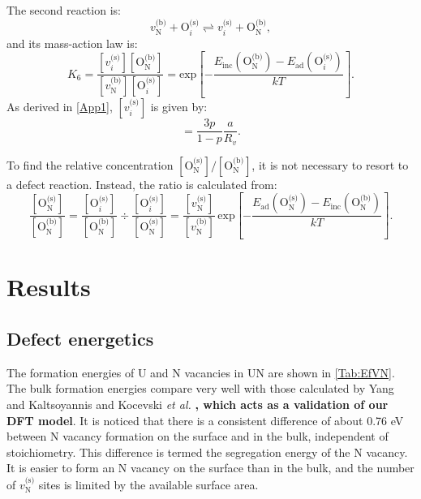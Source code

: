\documentclass[preprint,12pt,sort&compress]{elsarticle}
\newcommand{\?}{\stackrel{?}{=}}
\providecommand{\DIFaddtex}[1]{{\bf #1}} %
\providecommand{\DIFaddbegin}{\protect\color{blue}} %
\providecommand{\DIFaddend}{\protect\color{black}} %
\providecommand{\DIFadd}[1]{\texorpdfstring{\DIFaddtex{#1}}{#1}} %
\newcommand{\DIFaddincludegraphics}[2][]{{\color{blue}\fbox{\DIFOincludegraphics[#1]{#2}}}} %
\DeclareRobustCommand{\DIFaddbegin}{\DIFOaddbegin \let\includegraphics\DIFaddincludegraphics} %
\DeclareRobustCommand{\DIFaddend}{\DIFOaddend \let\includegraphics\DIFOincludegraphics} %
\begin{document}
The second reaction is:
\begin{equation}
v_\text{N}^\text{(b)} + \text{O}_i^\text{(s)}  \rightleftharpoons v_i^\text{(s)} + \text{O}_\text{N}^\text{(b)},
\end{equation}
and its mass-action law is:
\begin{equation}
K_6 = \frac{ [ v_i^\text{(s)} ]  [ \text{O}_\text{N}^\text{(b)} ] }{ [ v_\text{N}^\text{(b)} ] [ \text{O}_i^\text{(s)} ] } = \text{exp}\! \left[ - \frac{ E_\text{inc}( \text{O}_\text{N}^\text{(b)} ) - E_\text{ad}( \text{O}_i^\text{(s)} ) }{ k T } \right].
\end{equation}
As derived in \ref{App1}, $[ v_i^\text{(s)} ]$ is given by:
\begin{equation}
[ v_i^\text{(s)} ] = \frac{3p}{1-p} \frac{a}{R_v}.
\label{Eq:v_i^s}
\end{equation}

To find the relative concentration $[ \text{O}_\text{N}^\text{(s)} ] / [ \text{O}_\text{N}^\text{(b)} ]$, it is not necessary to resort to a defect reaction. Instead, the ratio is calculated from: 
\begin{equation}
\frac{ [ \text{O}_\text{N}^\text{(s)} ] }{ [ \text{O}_\text{N}^\text{(b)} ] } = \frac{ [ \text{O}_i^\text{(s)} ] }{ [ \text{O}_\text{N}^\text{(b)} ] } \div \frac{ [ \text{O}_i^\text{(s)} ] }{ [ \text{O}_\text{N}^\text{(s)} ] } = \frac{ [v_\text{N}^\text{(s)}] }{ [v_\text{N}^\text{(b)}] } \, \text{exp}\! \left[ - \frac{ E_\text{ad}( \text{O}_\text{N}^\text{(s)} ) - E_\text{inc}( \text{O}_\text{N}^\text{(b)} ) }{ k T } \right].
\label{Eq:ONs_ONb}
\end{equation}

\section{Results}
\label{Sec:Results}

\subsection{Defect energetics}
\label{Sec:DefE}

The formation energies of U and N vacancies in UN are shown in \cref{Tab:EfVN}. The bulk formation energies compare very well with those calculated by Yang and Kaltsoyannis \cite{Yang2021} and Kocevski \textit{et al.} \cite{Kocevski2022I}\DIFaddbegin \DIFadd{, which acts as a validation of our DFT model}\DIFaddend . It is noticed that there is a consistent difference of about 0.76 eV between N vacancy formation on the surface and in the bulk, independent of stoichiometry. This difference is termed the segregation energy of the N vacancy. It is easier to form an N vacancy on the surface than in the bulk, and the number of $v_\text{N}^\text{(s)}$ sites is limited by the available surface area.
\end{document}

